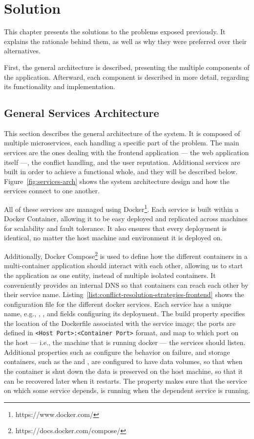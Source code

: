 \chapter{Solution}\label{chap:solution}

This chapter presents the solutions to the problems exposed previously. It explains the rationale behind them, as well as why they were preferred over their alternatives.

First, the general architecture is described, presenting the multiple components of the application. Afterward, each component is described in more detail, regarding its functionality and implementation.

\section{General Services Architecture}

This section describes the general architecture of the system. It is composed of multiple microservices, each handling a specific part of the problem. The main services are the ones dealing with the frontend application --- the web application itself ---, the conflict handling, and the user reputation. Additional services are built in order to achieve a functional whole, and they will be described below. Figure~\ref{fig:services-arch} shows the system architecture design and how the services connect to one another.

All of these services are managed using Docker\footnote{https://www.docker.com/}. Each service is built within a Docker Container, allowing it to be easy deployed and replicated across machines for scalability and fault tolerance. It also ensures that every deployment is identical, no matter the host machine and environment it is deployed on.

Additionally, Docker Compose\footnote{https://docs.docker.com/compose/} is used to define how the different containers in a multi-container application should interact with each other, allowing us to start the application as one entity, instead of multiple isolated containers. It conveniently provides an internal DNS so that containers can reach each other by their service name. Listing~\ref{list:conflict-resolution-strategies-frontend} shows the configuration file for the different docker services. Each service has a unique name, e.g., , , and fields configuring its deployment. The build property specifies the location of the Dockerfile associated with the service image; the ports are defined in \verb+<Host Port>:<Container Port>+ format, and map to which port on the host --- i.e., the machine that is running docker --- the services should listen. Additional properties such as  configure the behavior on failure, and storage containers, such as the  and , are configured to have data volumes, so that when the container is shut down the data is preserved on the host machine, so that it can be recovered later when it restarts. The  property makes sure that the service on which some service depends, is running when the dependent service is running.

